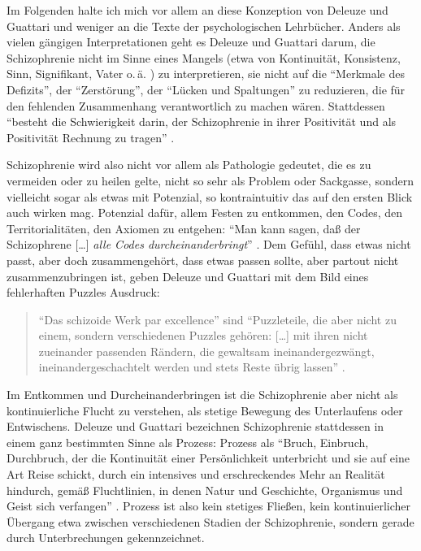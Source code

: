 \documentclass[12pt,
               DIV13,
               paper=a4,
               twoside=false,
               onehalfspacing,
               bibliography=totoc,
               toc=graduated,
               draft,
               ]{scrartcl}
\newcommand{\lips}{\dots\unkern}
\newcommand{\pc}[2]{\parencite[#1]{#2}}
\newcommand{\vgl}[2]{\parencite[vgl.][#1]{#2}}
\newcommand{\worries}[1]{\ifdraft{\textcolor{blue}{\texttt{(#1)}}}{}}
\newcommand{\gwg}{G--W--G'\xspace}
\newcommand{\dg}{Deleuze und Guattari\xspace}
\begin{document}

%

Im Folgenden halte ich mich vor allem an diese Konzeption von \dg und
weniger an die Texte der psychologischen Lehrbücher. Anders als vielen
gängigen Interpretationen geht es Deleuze und Guattari darum, die
Schizophrenie nicht im Sinne eines Mangels (etwa von Kontinuität,
Konsistenz, Sinn, Signifikant, Vater o.\,ä. \vgl{24}{schizg})
zu interpretieren, sie nicht auf die "`Merkmale des Defizits"', der
"`Zerstörung"', der "`Lücken und Spaltungen"' \pc{24}{schizg} zu
reduzieren, die für den fehlenden Zusammenhang verantwortlich zu
machen wären. Stattdessen "`besteht die Schwierigkeit darin, der
Schizophrenie in ihrer Positivität und als Positivität Rechnung zu
tragen"' \pc{24}{schizg}.

Schizophrenie wird also nicht vor allem als Pathologie gedeutet, die
es zu vermeiden oder zu heilen gelte, nicht so sehr als Problem oder
Sackgasse, sondern vielleicht sogar als etwas mit Potenzial, so
kontraintuitiv das auf den ersten Blick auch wirken mag. Potenzial
dafür, allem Festen zu entkommen, den Codes, den Territorialitäten, den
Axiomen zu entgehen: "`Man kann sagen, daß der Schizophrene [\lips]
\emph{alle Codes durcheinanderbringt}"' \pc{S. 22, Hervorh. im
Orig.}{ao}. Dem Gefühl, dass etwas nicht passt, aber doch
zusammengehört, dass etwas passen sollte, aber partout nicht
zusammenzubringen ist, geben \dg mit dem Bild eines fehlerhaften
Puzzles Ausdruck:
%
\begin{spacing}{1}
\begin{quote}
"`Das schizoide Werk par excellence"' \pc{54}{ao} sind "`Puzzleteile,
die aber nicht zu einem, sondern verschiedenen Puzzles gehören:
[\lips] mit ihren nicht zueinander passenden Rändern, die gewaltsam
ineinandergezwängt, ineinandergeschachtelt werden und stets Reste
übrig lassen"' \pc{54}{ao}.
\end{quote}
\end{spacing}

Im Entkommen und Durcheinanderbringen ist die Schizophrenie aber nicht
als kontinuierliche Flucht zu verstehen, als stetige Bewegung des
Unterlaufens oder Entwischens. \dg bezeichnen Schizophrenie
stattdessen in einem ganz bestimmten Sinne als Prozess: Prozess als
"`Bruch, Einbruch, Durchbruch, der die Kontinuität einer
Persönlichkeit unterbricht und sie auf eine Art Reise schickt, durch
ein intensives und erschreckendes \glq Mehr an Realität\grq{}
hindurch, gemäß Fluchtlinien, in denen Natur und Geschichte,
Organismus und Geist sich verfangen"' \pc{28}{schizg}. Prozess ist
also kein stetiges Fließen, kein kontinuierlicher Übergang etwa
zwischen verschiedenen Stadien der Schizophrenie, sondern gerade durch
Unterbrechungen gekennzeichnet.
\end{document}
